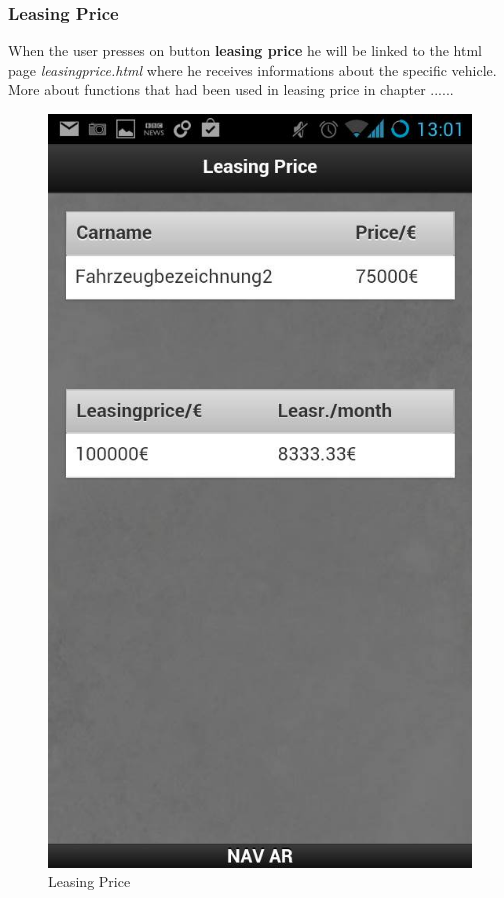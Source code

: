 \subsubsection{Leasing Price}
When the user presses on button \textbf{leasing price} he will be linked to the html page \textit{leasingprice.html} where he receives informations about the specific vehicle. More about functions that had been used in leasing price in chapter ......

\begin{figure}[h]
\centering
\includegraphics[width=0.4\linewidth]{graphics/chapter4/5}
\caption{Leasing Price}
\label{fig:6}
\end{figure}


